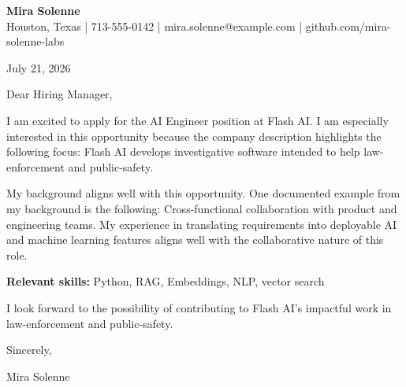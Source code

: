 \documentclass[11pt]{article}
\begin{document}
\begin{center}
{\Large\bfseries Mira Solenne}\\
Houston, Texas | 713-555-0142 | mira.solenne@example.com | github.com/mira-solenne-labs
\end{center}

July 21, 2026

Dear Hiring Manager,

I am excited to apply for the AI Engineer position at Flash AI. I am especially interested in this opportunity because the company description highlights the following focus: Flash AI develops investigative software intended to help law-enforcement and public-safety.

My background aligns well with this opportunity. One documented example from my background is the following: Cross-functional collaboration with product and engineering teams. My experience in translating requirements into deployable AI and machine learning features aligns well with the collaborative nature of this role.

\textbf{Relevant skills:} Python, RAG, Embeddings, NLP, vector search

I look forward to the possibility of contributing to Flash AI's impactful work in law-enforcement and public-safety.

Sincerely,

Mira Solenne
\end{document}
